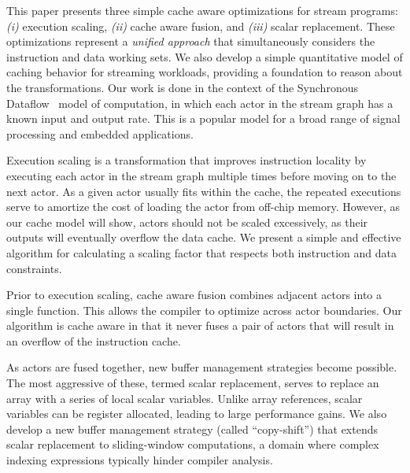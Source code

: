 \documentclass{sigplanconf}
\begin{document}

This paper presents three simple cache aware optimizations for stream
programs: {\it (i)} execution scaling, {\it (ii)} cache aware fusion,
and {\it (iii)} scalar replacement.  These optimizations represent a
{\it unified approach} that simultaneously considers the instruction
and data working sets.  We also develop a simple quantitative model of
caching behavior for streaming workloads, providing a foundation to
reason about the transformations.  Our work is done in the context of
the Synchronous Dataflow~\cite{LM87-i} model of computation, in which
each actor in the stream graph has a known input and output rate.  This
is a popular model for a broad range of signal processing and embedded
applications.

Execution scaling is a transformation that improves instruction
locality by executing each actor in the stream graph multiple times
before moving on to the next actor.  As a given actor usually fits
within the cache, the repeated executions serve to amortize the cost
of loading the actor from off-chip memory.  However, as our cache
model will show, actors should not be scaled excessively, as their
outputs will eventually overflow the data cache.  We present a simple
and effective algorithm for calculating a scaling factor that respects
both instruction and data constraints.

Prior to execution scaling, cache aware fusion combines adjacent
actors into a single function.  This allows the compiler to optimize
across actor boundaries.  Our algorithm is cache aware in that it
never fuses a pair of actors that will result in an overflow of the
instruction cache.

As actors are fused together, new buffer management strategies become
possible.  The most aggressive of these, termed scalar replacement,
serves to replace an array with a series of local scalar variables.
Unlike array references, scalar variables can be register allocated,
leading to large performance gains.  We also develop a new buffer
management strategy (called ``copy-shift'') that extends scalar
replacement to sliding-window computations, a domain where complex
indexing expressions typically hinder compiler analysis.
\end{document}
